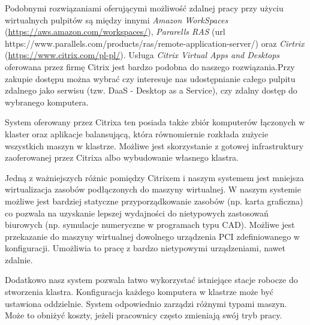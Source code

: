 \documentclass[../wstep.tex]{subfiles}
\begin{document}
Podobnymi rozwiązaniami oferującymi możliwość zdalnej pracy przy użyciu wirtualnych pulpitów są między innymi \textit{Amazon WorkSpaces} (\url{https://aws.amazon.com/workspaces/}), \textit{Pararells RAS} (url {https://www.parallels.com/products/ras/remote-application-server/}) oraz \textit{Cirtrix} (\url{https://www.citrix.com/pl-pl/}).
Usługa \textit{Citrix Virtual Apps and Desktops} \parencite{citrix-daas} oferowana przez firmę Citrix jest bardzo podobna do naszego rozwiązania.Przy zakupie dostępu można wybrać czy interesuje nas udostępnianie całego pulpitu zdalnego jako serwisu (tzw. DaaS - Desktop as a Service), czy zdalny dostęp do wybranego komputera.

System oferowany przez Citrixa ten posiada także zbiór komputerów łączonych w klaster oraz aplikacje balansującą, która równomiernie rozkłada zużycie wszystkich maszyn w klastrze.
Możliwe jest skorzystanie z gotowej infrastruktury zaoferowanej przez Citrixa albo wybudowanie własnego klastra.

Jedną z ważniejszych różnic pomiędzy Citrixem i naszym systemem jest mniejsza wirtualizacja zasobów podłączonych do maszyny wirtualnej.
W naszym systemie możliwe jest bardziej statyczne przyporządkowanie zasobów (np. karta graficzna) co pozwala na uzyskanie lepszej wydajności do nietypowych zastosowań biurowych (np. symulacje numeryczne w programach typu CAD).
Możliwe jest przekazanie do maszyny wirtualnej dowolnego urządzenia PCI zdefiniowanego w konfiguracji.
Umożliwia to pracę z bardzo nietypowymi urządzeniami, nawet zdalnie.

Dodatkowo nasz system pozwala łatwo wykorzystać istniejące stacje robocze do stworzenia klastra.
Konfiguracja każdego komputera w klastrze może być ustawiona oddzielnie. System odpowiednio zarządzi różnymi typami maszyn.
Może to obniżyć koszty, jeżeli pracownicy często zmieniają swój tryb pracy.
\end{document}
